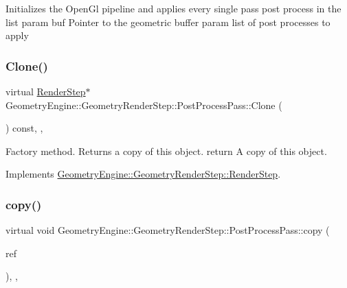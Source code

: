 Initializes the Open\+Gl pipeline and applies every single pass post process in the list param buf Pointer to the geometric buffer param list of post processes to apply \mbox{\label{class_geometry_engine_1_1_geometry_render_step_1_1_post_process_pass_afcf20dc0a20cf1e0fb730c7b56071c26}} 
\subsubsection{\texorpdfstring{Clone()}{Clone()}}
{\footnotesize\ttfamily virtual \mbox{\hyperlink{class_geometry_engine_1_1_geometry_render_step_1_1_render_step}{Render\+Step}}$\ast$ Geometry\+Engine\+::\+Geometry\+Render\+Step\+::\+Post\+Process\+Pass\+::\+Clone (\begin{DoxyParamCaption}{ }\end{DoxyParamCaption}) const\hspace{0.3cm}{\ttfamily [inline]}, {\ttfamily [override]}, {\ttfamily [virtual]}}

Factory method. Returns a copy of this object. return A copy of this object. 

Implements \mbox{\hyperlink{class_geometry_engine_1_1_geometry_render_step_1_1_render_step_afe33ea9d82c5be11f55af7d39691d44b}{Geometry\+Engine\+::\+Geometry\+Render\+Step\+::\+Render\+Step}}.

\mbox{\label{class_geometry_engine_1_1_geometry_render_step_1_1_post_process_pass_a5279399395c18ac4ef35fa3028aa4950}} 
\subsubsection{\texorpdfstring{copy()}{copy()}}
{\footnotesize\ttfamily virtual void Geometry\+Engine\+::\+Geometry\+Render\+Step\+::\+Post\+Process\+Pass\+::copy (\begin{DoxyParamCaption}\item[{const \mbox{\hyperlink{class_geometry_engine_1_1_geometry_render_step_1_1_post_process_pass}{Post\+Process\+Pass}} \&}]{ref }\end{DoxyParamCaption})\hspace{0.3cm}{\ttfamily [inline]}, {\ttfamily [protected]}, {\ttfamily [virtual]}}

